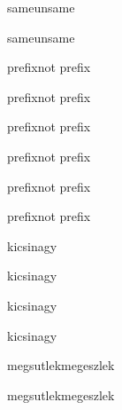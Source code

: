 same\else unsame\fi

same\else unsame\fi

prefix\else not prefix\fi

prefix\else not prefix\fi

prefix\else not prefix\fi

prefix\else not prefix\fi

prefix\else not prefix\fi

prefix\else not prefix\fi

kicsi\else nagy\fi

kicsi\else nagy\fi

kicsi\else nagy\fi

kicsi\else nagy\fi

megsutlek\else megeszlek\fi

megsutlek\else megeszlek\fi

\label{jozsika}


\lowercase{\edef\xxx{\label@to@anchor{JOzsIKa}}}
\xxx

